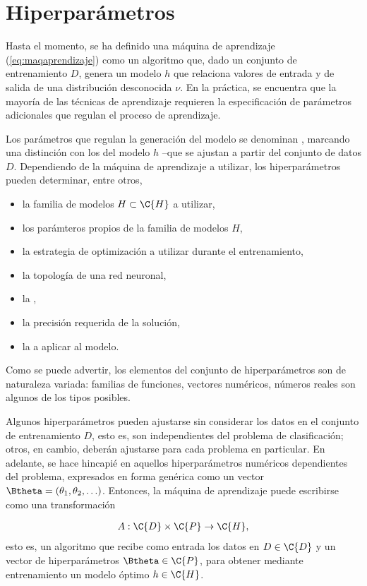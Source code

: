 \section{Hiperparámetros}
Hasta el momento, se ha definido una máquina de aprendizaje
(\autoref{eq:maqaprendizaje}) como un algoritmo que, dado un conjunto
de entrenamiento $D$, genera un modelo $h$ que relaciona valores de
entrada y de salida de una distribución desconocida $\nu$. En la
práctica, se encuentra que la mayoría de las técnicas de aprendizaje
requieren la especificación de parámetros adicionales que regulan el
proceso de aprendizaje.

Los parámetros que regulan la generación del modelo se denominan
, marcando una distinción con los 
del modelo $h$ --que se ajustan a partir del conjunto de datos
$D$. Dependiendo de la máquina de aprendizaje a utilizar, los
hiperparámetros pueden determinar, entre otros,

\begin{itemize}
\item la familia de modelos $H\subset\C{H}$ a utilizar,
\item los parámteros propios de la familia de modelos $H$,
\item la estrategia de optimización a utilizar durante el
  entrenamiento,
\item la topología de una red neuronal,
\item la ,
\item la precisión requerida de la solución,
\item la  a aplicar al modelo.
\end{itemize}
Como se puede advertir, los elementos del conjunto de hiperparámetros
son de naturaleza variada: familias de funciones, vectores numéricos,
números reales son algunos de los tipos posibles.

Algunos hiperparámetros pueden ajustarse sin considerar los datos en
el conjunto de entrenamiento $D$, esto es, son independientes del
problema de clasificación; otros, en cambio, deberán ajustarse para
cada problema en particular. En adelante, se hace hincapié en aquellos
hiperparámetros numéricos dependientes del problema, expresados en
forma genérica como un vector
$\Btheta=(\theta_1,\theta_2,\ldots)$.  Entonces, la máquina de
aprendizaje puede escribirse como una transformación

\begin{align}
  A:\C{D}\times\C{P}\rightarrow\C{H},
\end{align}
esto es, un algoritmo que recibe como entrada los datos en $D\in\C{D}$
y un vector de hiperparámetros
$\Btheta\in\C{P}$, para obtener mediante
entrenamiento un modelo óptimo $h\in\C{H}$.

